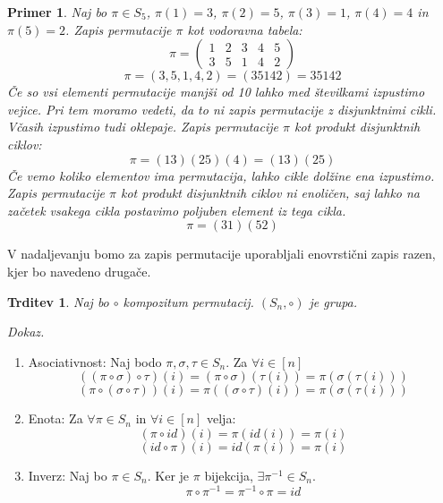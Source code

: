 \documentclass[a4paper, 12pt]{book}
\newtheorem{trditev}{Trditev}[chapter]
\newtheorem{primer}{Primer}[chapter]
\newenvironment{dokaz}{\emph{Dokaz.}\ }{\hspace{\fill}{$\Box$}}
\begin{document}
\begin{primer}
    Naj bo $\pi \in S_5$, $\pi(1) = 3$, $\pi(2) = 5$, $\pi(3) = 1$, $\pi(4) = 4$ in $\pi(5) = 2$. Zapis permutacije $\pi$ kot vodoravna tabela:
    \[
        \pi = \begin{pmatrix}
            1 & 2 & 3 & 4 & 5 \\
            3 & 5 & 1 & 4 & 2
        \end{pmatrix}
    \]
    \[
        \pi = (3, 5, 1, 4, 2) = (3 5 1 4 2) = 35142
    \]
    Če so vsi elementi permutacije manjši od 10 lahko med številkami izpustimo vejice. Pri tem moramo vedeti, da to ni zapis permutacije z disjunktnimi cikli.
    Včasih izpustimo tudi oklepaje.
    Zapis permutacije $\pi$ kot produkt disjunktnih ciklov:
    \[
        \pi = (1 3)(2 5)(4) = (1 3)(2 5)
    \]
    Če vemo koliko elementov ima permutacija, lahko cikle dolžine ena izpustimo. Zapis permutacije $\pi$ kot produkt disjunktnih ciklov ni enoličen, saj lahko na začetek vsakega cikla postavimo poljuben element iz tega cikla.
    \[
        \pi = (3 1)(5 2)
    \]
\end{primer}

V nadaljevanju bomo za zapis permutacije uporabljali enovrstični zapis razen, kjer bo navedeno drugače.

\begin{trditev}
    Naj bo $\circ$ kompozitum permutacij. $(S_n, \circ)$ je grupa.
\end{trditev}
\begin{dokaz}
    \begin{enumerate}
        \item Asociativnost: Naj bodo $\pi, \sigma, \tau \in S_n$. Za $\forall i \in [n]$ 
        \[
            ((\pi \circ \sigma) \circ \tau)(i) = (\pi \circ \sigma)(\tau(i)) = \pi(\sigma(\tau(i)))
        \]
        \[
            (\pi \circ (\sigma \circ \tau))(i) = \pi((\sigma \circ \tau)(i)) = \pi(\sigma(\tau(i))) 
        \]
        \item Enota: Za $\forall \pi \in S_n$ in $\forall i \in [n]$ velja:
        \[
            (\pi \circ id)(i) = \pi(id(i)) = \pi(i)
        \]
        \[
            (id \circ \pi)(i) = id(\pi(i)) = \pi(i)
        \]
        \item Inverz: Naj bo $\pi \in S_n$. Ker je $\pi$ bijekcija, $\exists \pi^{-1} \in S_n$.
        \[
            \pi \circ \pi^{-1} = \pi^{-1} \circ \pi = id
        \]
    \end{enumerate}
\end{dokaz}
\end{document}
